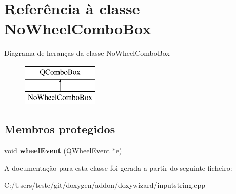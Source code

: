 \hypertarget{class_no_wheel_combo_box}{\section{Referência à classe No\-Wheel\-Combo\-Box}
\label{class_no_wheel_combo_box}
}
Diagrama de heranças da classe No\-Wheel\-Combo\-Box\begin{figure}[H]
\begin{center}
\leavevmode
\includegraphics[height=2.000000cm]{class_no_wheel_combo_box}
\end{center}
\end{figure}
\subsection*{Membros protegidos}
\begin{DoxyCompactItemize}
\item 
\hypertarget{class_no_wheel_combo_box_ab02de04457ef8554159ce7795177b057}{void {\bfseries wheel\-Event} (Q\-Wheel\-Event $\ast$e)}\label{class_no_wheel_combo_box_ab02de04457ef8554159ce7795177b057}

\end{DoxyCompactItemize}


A documentação para esta classe foi gerada a partir do seguinte ficheiro\-:\begin{DoxyCompactItemize}
\item 
C\-:/\-Users/teste/git/doxygen/addon/doxywizard/inputstring.\-cpp\end{DoxyCompactItemize}
